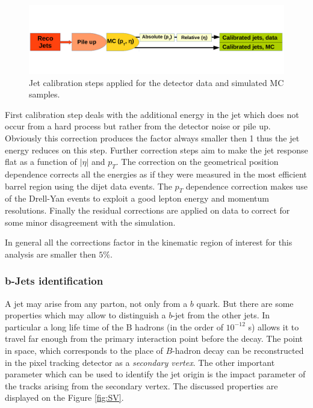 \begin{figure}[h]
  \centering
  \includegraphics[width=1.0\textwidth]{04_event_reconstruction/plots/JEC.pdf}
  \caption{Jet calibration steps applied for the detector data and simulated MC samples.}
  \label{fig:JECsc}
\end{figure}

First calibration step deals with the additional energy in the jet which does not occur from a hard process but rather from the detector noise or pile up. 
Obviously this correction produces the factor always smaller then 1 thus the jet energy reduces on this step. Further correction steps aim to make the jet response
flat as a function of $|\eta|$ and $p_{T}$. The correction on the geometrical position dependence corrects all the energies as if they were measured 
in the most efficient barrel region using the dijet data events. The $p_{T}$ dependence correction makes use of the Drell-Yan events to exploit a good
lepton energy and momentum resolutions. Finally the residual corrections are applied on data to correct for some minor disagreement with the simulation.

In general all the corrections factor in the kinematic region of interest for this analysis are smaller then $5\%$.

\subsubsection{b-Jets identification}\label{ssec:bTag}

A jet may arise from any parton, not only from a $b$ quark. But there are some properties which may allow to distinguish a $b$-jet from the other jets. In particular
a long life time of the B hadrons (in the order of $10^{-12}$ s) allows it to travel far enough from the primary interaction point before the decay. The point
in space, which corresponds to the place of $B$-hadron decay can be reconstructed in the pixel tracking detector as a \textit{secondary vertex}. The other important
parameter which can be used to identify the jet origin is the impact parameter of the tracks arising from the secondary vertex. The discussed properties are 
displayed on the Figure \ref{fig:SV}.

